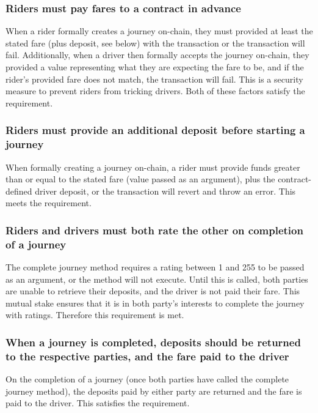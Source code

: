 \subsubsection*{Riders must pay fares to a contract in advance}

When a rider formally creates a journey on-chain, they must provided at least the stated fare (plus deposit, see below) with the transaction or the transaction will fail. Additionally, when a driver then formally accepts the journey on-chain, they provided a value representing what they are expecting the fare to be, and if the rider's provided fare does not match, the transaction will fail. This is a security measure to prevent riders from tricking drivers. Both of these factors satisfy the requirement.

\subsubsection*{Riders must provide an additional deposit before starting a journey}

When formally creating a journey on-chain, a rider must provide funds greater than or equal to the stated fare (value passed as an argument), plus the contract-defined driver deposit, or the transaction will revert and throw an error. This meets the requirement.

\subsubsection*{Riders and drivers must both rate the other on completion of a journey}

The complete journey method requires a rating between 1 and 255 to be passed as an argument, or the method will not execute. Until this is called, both parties are unable to retrieve their deposits, and the driver is not paid their fare. This mutual stake ensures that it is in both party's interests to complete the journey with ratings. Therefore this requirement is met.

\subsubsection*{When a journey is completed, deposits should be returned to the respective parties, and the fare paid to the driver}

On the completion of a journey (once both parties have called the complete journey method), the deposits paid by either party are returned and the fare is paid to the driver. This satisfies the requirement.

